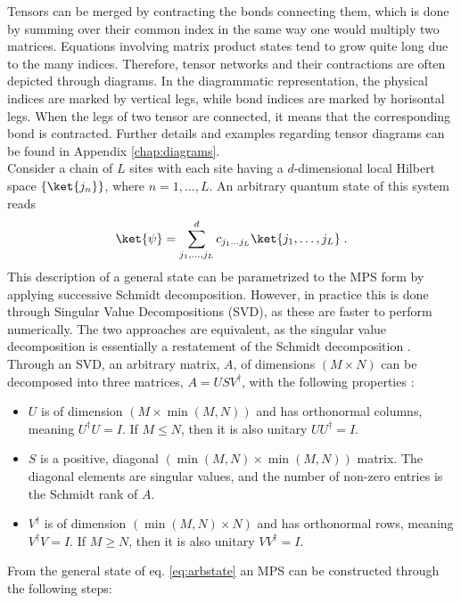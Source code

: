 Tensors can be merged by contracting the bonds connecting them, which is done by summing over their common index in the same way one would multiply two matrices.
Equations involving matrix product states tend to grow quite long due to the many indices. Therefore, tensor networks and their contractions are often depicted through diagrams. In the diagrammatic representation, the physical indices are marked by vertical legs, while bond indices are marked by horisontal legs. When the legs of two tensor are connected, it means that the corresponding bond is contracted. Further details and examples regarding tensor diagrams can be found in Appendix \ref{chap:diagrams}.\\

Consider a chain of $L$ sites with each site having a $d$-dimensional local Hilbert space $\{ \ket{j_n} \}$, where $n = 1, \ldots, L$. An arbitrary quantum state of this system reads
\begin{equation}
	\ket{\psi} = \sum_{j_1, \ldots, j_L}^{d} c_{j_1 \ldots j_L} \ket{j_1, \ldots, j_L} \; .
	\label{eq:arbstate}
\end{equation}
This description of a general state can be parametrized to the MPS form by applying successive Schmidt decomposition. However, in practice this is done through Singular Value Decompositions (SVD), as these are faster to perform numerically. The two approaches are equivalent, as the singular value decomposition is essentially a restatement of the Schmidt decomposition \cite{Pathak2013}.
Through an SVD, an arbitrary matrix, $A$, of dimensions $(M \times N)$ can be decomposed into three matrices, $A = U S V^{\dag}$, with the following properties \cite{schollwock}:
\begin{itemize}
\item
$U$ is of dimension $(M \times \min(M,N))$ and has orthonormal columns, meaning $U^{\dag}U = I$. If $M \leq N$, then it is also unitary $U U^{\dag} = I$.

\item
$S$ is a positive, diagonal $(\min(M,N) \times \min(M,N))$ matrix. The diagonal elements are singular values, and the number of non-zero entries is the Schmidt rank of $A$.

\item
$V^{\dag}$ is of dimension $(\min(M,N) \times N)$ and has orthonormal rows, meaning $V^{\dag}V = I$. If $M \geq N$, then it is also unitary $V V^{\dag} = I$.
\end{itemize} 
From the general state of eq. \eqref{eq:arbstate} an MPS can be constructed through the following steps:
